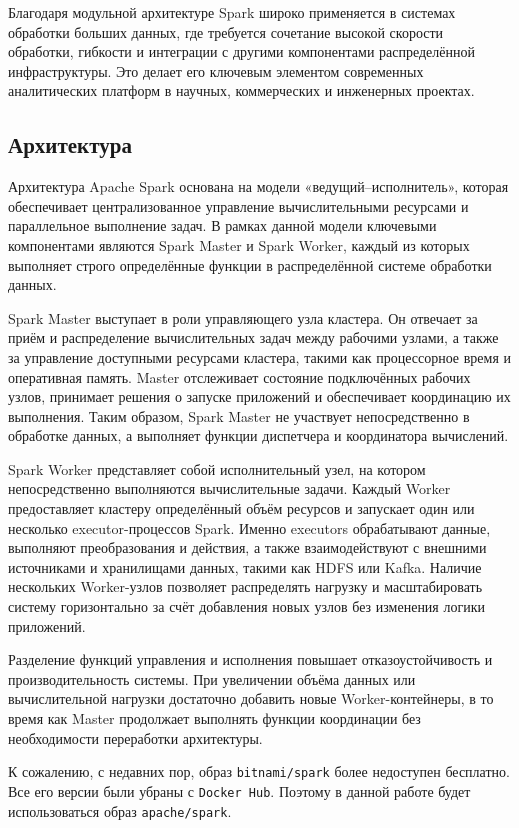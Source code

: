 \documentclass[14pt,a4paper]{extarticle}
\begin{document}
Благодаря модульной архитектуре Spark широко применяется в системах обработки
больших данных, где требуется сочетание высокой скорости обработки, гибкости и
интеграции с другими компонентами распределённой инфраструктуры. Это делает его
ключевым элементом современных аналитических платформ в научных, коммерческих и
инженерных проектах.

\subsection{Архитектура}

Архитектура Apache Spark основана на модели «ведущий–исполнитель», которая
обеспечивает централизованное управление вычислительными ресурсами и
параллельное выполнение задач. В рамках данной модели ключевыми компонентами
являются Spark Master и Spark Worker, каждый из которых выполняет строго
определённые функции в распределённой системе обработки данных.

Spark Master выступает в роли управляющего узла кластера. Он отвечает за приём
и распределение вычислительных задач между рабочими узлами, а также за
управление доступными ресурсами кластера, такими как процессорное время и
оперативная память. Master отслеживает состояние подключённых рабочих узлов,
принимает решения о запуске приложений и обеспечивает координацию их
выполнения. Таким образом, Spark Master не участвует непосредственно в
обработке данных, а выполняет функции диспетчера и координатора вычислений.

Spark Worker представляет собой исполнительный узел, на котором непосредственно
выполняются вычислительные задачи. Каждый Worker предоставляет кластеру
определённый объём ресурсов и запускает один или несколько executor-процессов
Spark. Именно executors обрабатывают данные, выполняют преобразования и
действия, а также взаимодействуют с внешними источниками и хранилищами данных,
такими как HDFS или Kafka. Наличие нескольких Worker-узлов позволяет
распределять нагрузку и масштабировать систему горизонтально за счёт добавления
новых узлов без изменения логики приложений.

Разделение функций управления и исполнения повышает отказоустойчивость и
производительность системы. При увеличении объёма данных или вычислительной
нагрузки достаточно добавить новые Worker-контейнеры, в то время как Master
продолжает выполнять функции координации без необходимости переработки
архитектуры.

К сожалению, с недавних пор, образ \texttt{bitnami/spark} более недоступен бесплатно.
Все его версии были убраны с \texttt{Docker Hub}. Поэтому в данной работе будет использоваться
образ \texttt{apache/spark}.
\end{document}
